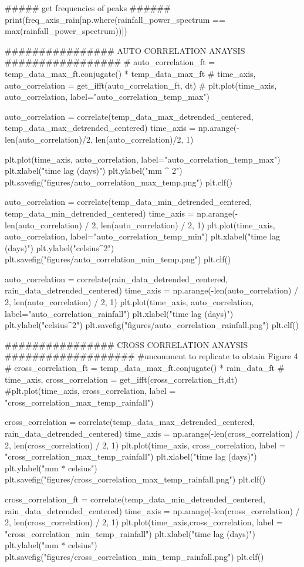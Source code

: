 \documentclass{article}
\begin{document}
\begin{python}
##### get frequencies of peaks ######
print(freq_axis_rain[np.where(rainfall_power_spectrum == max(rainfall_power_spectrum))])

################ AUTO CORRELATION ANAYSIS #################
# auto_correlation_ft = temp_data_max_ft.conjugate() * temp_data_max_ft
# time_axis, auto_correlation = get_ifft(auto_correlation_ft, dt)
# plt.plot(time_axis, auto_correlation, label="auto_correlation_temp_max")

    auto_correlation = correlate(temp_data_max_detrended_centered, temp_data_max_detrended_centered)
time_axis = np.arange(-len(auto_correlation)/2, len(auto_correlation)/2, 1)

plt.plot(time_axis, auto_correlation, label="auto_correlation_temp_max")
plt.xlabel("time lag (days)")
plt.ylabel("mm ^ 2")
plt.savefig("figures/auto_correlation_max_temp.png")
plt.clf()

auto_correlation = correlate(temp_data_min_detrended_centered, temp_data_min_detrended_centered)
time_axis = np.arange(-len(auto_correlation) / 2, len(auto_correlation) / 2, 1)
plt.plot(time_axis, auto_correlation, label="auto_correlation_temp_min")
plt.xlabel("time lag (days)")
plt.ylabel("celsius^2")
plt.savefig("figures/auto_correlation_min_temp.png")
plt.clf()

auto_correlation = correlate(rain_data_detrended_centered, rain_data_detrended_centered)
time_axis = np.arange(-len(auto_correlation) / 2, len(auto_correlation) / 2, 1)
plt.plot(time_axis, auto_correlation, label="auto_correlation_rainfall")
plt.xlabel("time lag (days)")
plt.ylabel("celsius^2")
plt.savefig("figures/auto_correlation_rainfall.png")
plt.clf()


################ CROSS CORRELATION ANAYSIS ###################
#uncomment to replicate to obtain Figure 4
# cross_correlation_ft = temp_data_max_ft.conjugate() * rain_data_ft
# time_axis, cross_correlation = get_ifft(cross_correlation_ft,dt)
#plt.plot(time_axis, cross_correlation, label = "cross_correlation_max_temp_rainfall")

cross_correlation = correlate(temp_data_max_detrended_centered, rain_data_detrended_centered)
time_axis = np.arange(-len(cross_correlation) / 2, len(cross_correlation) / 2, 1)
plt.plot(time_axis, cross_correlation, label = "cross_correlation_max_temp_rainfall")
plt.xlabel("time lag (days)")
plt.ylabel("mm * celsius")
plt.savefig("figures/cross_correlation_max_temp_rainfall.png")
plt.clf()

cross_correlation_ft = correlate(temp_data_min_detrended_centered, rain_data_detrended_centered)
time_axis = np.arange(-len(cross_correlation) / 2, len(cross_correlation) / 2, 1)
plt.plot(time_axis,cross_correlation, label = "cross_correlation_min_temp_rainfall")
plt.xlabel("time lag (days)")
plt.ylabel("mm * celsius")
plt.savefig("figures/cross_correlation_min_temp_rainfall.png")
plt.clf()


\end{python}
\end{document}
